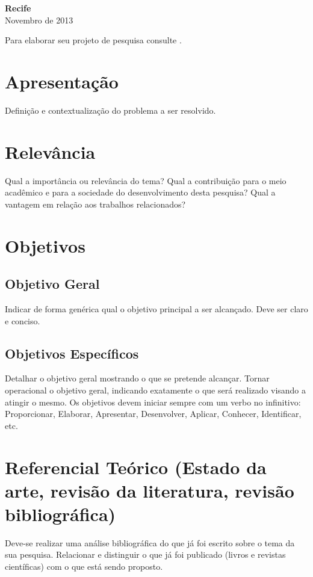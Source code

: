 \documentclass[a4paper,11pt]{article}
\begin{document}
\vspace{3.0cm}
\begin{center}
{\large {\bf Recife}\\[6mm]
Novembro de 2013}
\end{center}
\newpage

\pagestyle {plain}
\setcounter{page}{0} 

Para elaborar seu projeto de pesquisa consulte \cite{Silva05}. 


\section{Apresentação}
Definição e contextualização do problema a ser resolvido.
\section{Relevância}
Qual a importância ou relevância do tema?  Qual a contribuição para o meio acadêmico e para a sociedade do desenvolvimento desta pesquisa? Qual a vantagem em relação aos trabalhos relacionados?
\section{Objetivos}
\subsection{Objetivo Geral}
Indicar de forma genérica qual o objetivo principal a ser alcançado. Deve ser claro e conciso.
\subsection{Objetivos Específicos}
Detalhar o objetivo geral mostrando o que se pretende alcançar. Tornar operacional o objetivo geral, indicando exatamente o que será realizado visando a atingir o mesmo.
Os objetivos devem iniciar sempre com um verbo no infinitivo: Proporcionar, Elaborar, Apresentar, Desenvolver, Aplicar, Conhecer, Identificar, etc.

\section{Referencial Teórico  (Estado da arte, revisão da literatura, revisão bibliográfica)} 
Deve-se realizar uma análise bibliográfica do que já foi escrito sobre o tema da sua pesquisa. Relacionar e distinguir o que já foi publicado (livros e revistas científicas) com o que está sendo proposto.
\end{document}
